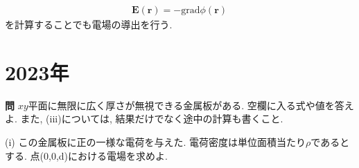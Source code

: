 \documentclass[a4paper,12pt]{jlreq}
\begin{document}
\begin{align}
  \bm{E}(\bm{r}) = -\text{grad}\phi(\bm{r})
\end{align}
を計算することでも電場の導出を行う. 

\newpage


\section*{2023年}




\begin{itembox}[l]{\textbf{問}}
  $xy$平面に無限に広く厚さが無視できる金属板がある. 空欄に入る式や値を答えよ.
  また, (iii)については, 結果だけでなく途中の計算も書くこと. 
\end{itembox}

\begin{itembox}[l]{(i)}
  この金属板に正の一様な電荷を与えた. 電荷密度は単位面積当たり$\rho$であるとする.
  点(0,0,d)における電場を求めよ. 
\end{itembox}
\par
\end{document}
